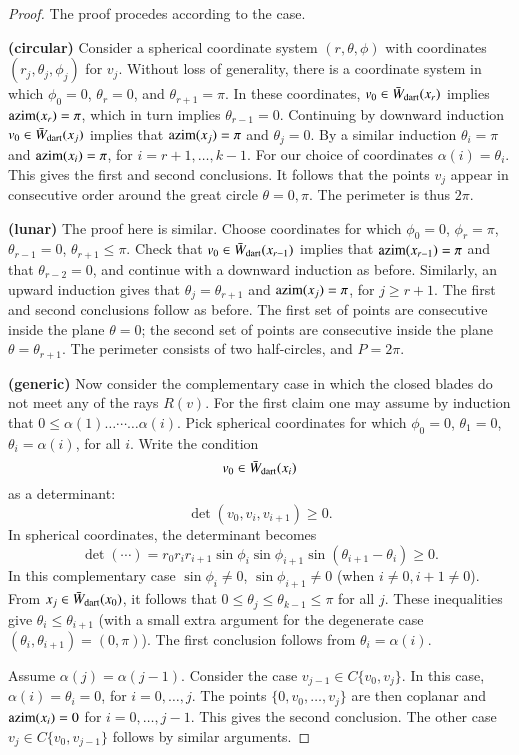 \begin{proof}  The proof procedes according to the case.

{\bf (circular)} Consider a spherical coordinate system $(r,\theta,\phi)$ with coordinates $(r_j,\theta_j,\phi_j)$ for $v_j$.  Without loss of generality, there is a coordinate system in which $\phi_0=0$, $\theta_r=0$, and $\theta_{r+1}=\pi$.  In these coordinates,  $v_0\in\bar W_{\text{dart}}(x_r)$ implies ${\operatorname{azim}}(x_r)=\pi$, which in turn implies $\theta_{r-1}=0$.  Continuing by downward induction $v_0\in \bar W_{\text{dart}}(x_j)$ implies that ${\operatorname{azim}}(x_j)=\pi$ and $\theta_j=0$.  By a similar induction $\theta_i=\pi$ and ${\operatorname{azim}}(x_i)=\pi$, for $i=r+1,\ldots,k-1$.  For our choice of coordinates $\alpha(i)=\theta_i$.  This gives the first and second conclusions.  It follows that the points $v_j$ appear in consecutive order around the great circle $\theta=0,\pi$.  The perimeter is thus $2\pi$.

{\bf (lunar)}  The proof here is similar.  Choose coordinates for which $\phi_0=0$, $\phi_r=\pi$, $\theta_{r-1}=0$, $\theta_{r+1}\le\pi$.  Check that $v_0\in \bar W_{\text{dart}}(x_{r-1})$ implies that ${\operatorname{azim}}(x_{r-1})=\pi$ and that $\theta_{r-2}=0$, and continue with a downward induction as before.  Similarly, an upward induction gives that $\theta_j=\theta_{r+1}$ and ${\operatorname{azim}}(x_j)=\pi$, for $j\ge r+1$.  The first and second conclusions follow as before.  The first set of points are consecutive inside the plane $\theta=0$; the second set of points are consecutive inside the plane $\theta=\theta_{r+1}$.  The perimeter consists of two half-circles, and $P=2\pi$.

{\bf (generic)} Now consider the complementary case in which the closed blades do not meet any of the rays $R(v)$.  For the first claim one may assume by induction that $0\le \alpha(1)\ldots\cdots\ldots \alpha(i)$.  Pick spherical coordinates for which $\phi_0=0$, $\theta_1=0$, $\theta_i=\alpha(i)$, for all $i$.  Write the condition
$$
v_0\in \bar W_{\text{dart}}(x_i)
$$
as a determinant:
$$
\det(v_0,v_i,v_{i+1})\ge 0.
$$
In spherical coordinates, the determinant becomes
$$
\det(\cdots)= r_0r_ir_{i+1}\sin\phi_i\sin\phi_{i+1}\sin(\theta_{i+1}-\theta_i)\ge0.
$$
In this complementary case $\sin\phi_i\ne0$, $\sin\phi_{i+1}\ne0$ (when $i\ne 0,i+1\ne 0$).  From $x_j\in \bar W_{\text{dart}}(x_0)$, it follows that $0\le\theta_j\le\theta_{k-1}\le\pi$ for all $j$.  These inequalities give $\theta_i\le\theta_{i+1}$ (with a small extra argument for the degenerate case $(\theta_i,\theta_{i+1})=(0,\pi)$).  The first conclusion follows from $\theta_i=\alpha(i)$.

Assume $\alpha(j)=\alpha(j-1)$.  Consider the case $v_{j-1}\in C\{v_0,v_j\}$.    In this case, $\alpha(i)=\theta_i=0$, for $i=0,\ldots,j$.  The points $\{0,v_0,\ldots,v_j\}$ are then coplanar and ${\operatorname{azim}}(x_i)=0$ for $i=0,\ldots,j-1$.  This gives the second conclusion. The other case $v_j\in C\{v_0,v_{j-1}\}$ follows by similar arguments.
\end{proof}

